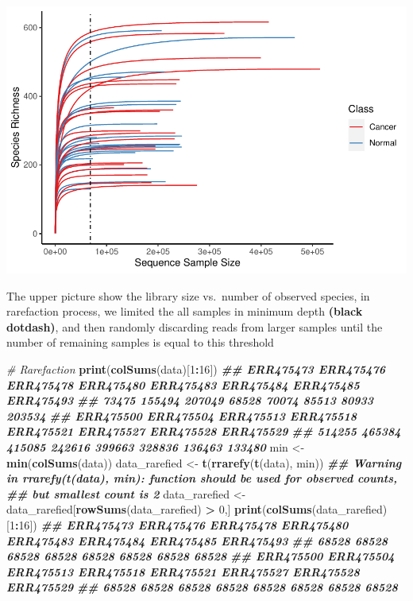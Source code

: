 \documentclass[
]{article}
\newenvironment{Shaded}{\begin{snugshade}}{\end{snugshade}}
\newcommand{\CommentTok}[1]{\textcolor[rgb]{0.56,0.35,0.01}{\textit{#1}}}
\newcommand{\DecValTok}[1]{\textcolor[rgb]{0.00,0.00,0.81}{#1}}
\newcommand{\DocumentationTok}[1]{\textcolor[rgb]{0.56,0.35,0.01}{\textbf{\textit{#1}}}}
\newcommand{\FunctionTok}[1]{\textcolor[rgb]{0.13,0.29,0.53}{\textbf{#1}}}
\newcommand{\NormalTok}[1]{#1}
\newcommand{\OtherTok}[1]{\textcolor[rgb]{0.56,0.35,0.01}{#1}}
\newcommand{\SpecialCharTok}[1]{\textcolor[rgb]{0.81,0.36,0.00}{\textbf{#1}}}
\begin{document}
\includegraphics{workshop_files/figure-latex/unnamed-chunk-13-1.pdf}

The upper picture show the library size vs.~number of observed species,
in rarefaction process, we limited the all samples in minimum depth
\textbf{(black dotdash)}, and then randomly discarding reads from larger
samples until the number of remaining samples is equal to this threshold

\begin{Shaded}
\begin{Highlighting}[]
\CommentTok{\# Rarefaction}
\FunctionTok{print}\NormalTok{(}\FunctionTok{colSums}\NormalTok{(data)[}\DecValTok{1}\SpecialCharTok{:}\DecValTok{16}\NormalTok{])}
\DocumentationTok{\#\# ERR475473 ERR475476 ERR475478 ERR475480 ERR475483 ERR475484 ERR475485 ERR475493 }
\DocumentationTok{\#\#     73475    155494    207049     68528     70074     85513     80933    203534 }
\DocumentationTok{\#\# ERR475500 ERR475504 ERR475513 ERR475518 ERR475521 ERR475527 ERR475528 ERR475529 }
\DocumentationTok{\#\#    514255    465384    415085    242616    399663    328836    136463    133480}
\NormalTok{min }\OtherTok{\textless{}{-}} \FunctionTok{min}\NormalTok{(}\FunctionTok{colSums}\NormalTok{(data))}
\NormalTok{data\_rarefied }\OtherTok{\textless{}{-}} \FunctionTok{t}\NormalTok{(}\FunctionTok{rrarefy}\NormalTok{(}\FunctionTok{t}\NormalTok{(data), min))}
\DocumentationTok{\#\# Warning in rrarefy(t(data), min): function should be used for observed counts,}
\DocumentationTok{\#\# but smallest count is 2}
\NormalTok{data\_rarefied }\OtherTok{\textless{}{-}}\NormalTok{ data\_rarefied[}\FunctionTok{rowSums}\NormalTok{(data\_rarefied) }\SpecialCharTok{\textgreater{}} \DecValTok{0}\NormalTok{,]}
\FunctionTok{print}\NormalTok{(}\FunctionTok{colSums}\NormalTok{(data\_rarefied)[}\DecValTok{1}\SpecialCharTok{:}\DecValTok{16}\NormalTok{])}
\DocumentationTok{\#\# ERR475473 ERR475476 ERR475478 ERR475480 ERR475483 ERR475484 ERR475485 ERR475493 }
\DocumentationTok{\#\#     68528     68528     68528     68528     68528     68528     68528     68528 }
\DocumentationTok{\#\# ERR475500 ERR475504 ERR475513 ERR475518 ERR475521 ERR475527 ERR475528 ERR475529 }
\DocumentationTok{\#\#     68528     68528     68528     68528     68528     68528     68528     68528}
\end{Highlighting}
\end{Shaded}
\end{document}
